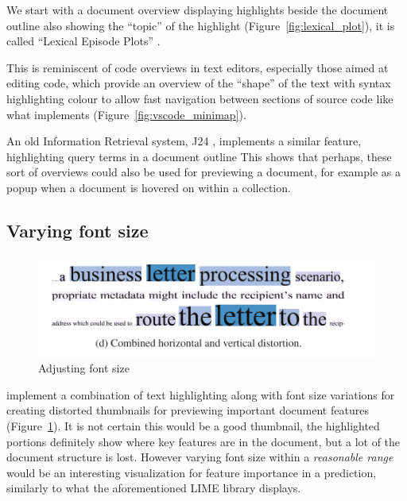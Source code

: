 \documentclass[\version]{l4proj}
\begin{document}
We start with a document overview displaying highlights beside the document outline also showing the ``topic'' of the highlight (Figure~\ref{fig:lexical_plot}), it is called ``Lexical Episode Plots'' \autocite{el-assadyVisArgueVisualText2016,goldExploratoryTextAnalysis2015}.

This is reminiscent of code overviews in text editors, especially those aimed at editing code, which provide an overview of the ``shape'' of the text with syntax highlighting colour to allow fast navigation between sections of source code like what \textcite{MicrosoftVscode2020} implements (Figure~\ref{fig:vscode_minimap}).

An old Information Retrieval system, J24 \autocite[7]{ogdenDocumentThumbnailVisualizations1998}, implements a similar feature, highlighting query terms in a document outline
This shows that perhaps, these sort of overviews could also be used for previewing a document, for example as a popup when a document is hovered on within a collection.

\subsection{Varying font size}

\begin{figure}
    \includegraphics[width=\linewidth]{images/document_visualization/font-size.png}
    \caption{Adjusting font size}\label{fig:font-size}
    \vspace{-10pt}
\end{figure}

\textcite{stoffelDocumentThumbnailsVariable2012} implement a combination of text highlighting along with font size variations for creating distorted thumbnails for previewing important document features (Figure~\ref{fig:font-size}).
It is not certain this would be a good thumbnail, the highlighted portions definitely show where key features are in the document, but a lot of the document structure is lost.
However varying font size within a \textit{reasonable range} would be an interesting visualization for feature importance in a prediction, similarly to what the aforementioned LIME library displays.
\end{document}
